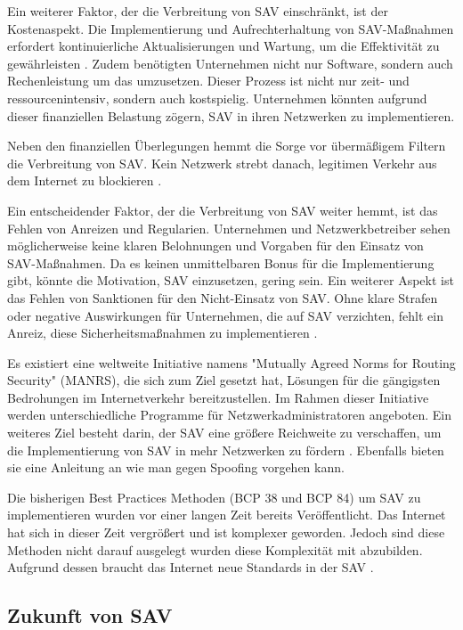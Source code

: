 \documentclass[sigplan,screen]{acmart}
\begin{document}
Ein weiterer Faktor, der die Verbreitung von SAV einschränkt, ist der Kostenaspekt. Die Implementierung und Aufrechterhaltung von SAV-Maßnahmen erfordert kontinuierliche Aktualisierungen und Wartung, um die Effektivität zu gewährleisten \cite{Lone01}. Zudem benötigten Unternehmen nicht nur Software, sondern auch Rechenleistung um das umzusetzen. Dieser Prozess ist nicht nur zeit- und ressourcenintensiv, sondern auch kostspielig. Unternehmen könnten aufgrund dieser finanziellen Belastung zögern, SAV in ihren Netzwerken zu implementieren.

Neben den finanziellen Überlegungen hemmt die Sorge vor übermäßigem Filtern die Verbreitung von SAV. Kein Netzwerk strebt danach, legitimen Verkehr aus dem Internet zu blockieren \cite{FrontDoor01}.

Ein entscheidender Faktor, der die Verbreitung von SAV weiter hemmt, ist das Fehlen von Anreizen und Regularien. Unternehmen und Netzwerkbetreiber sehen möglicherweise keine klaren Belohnungen und Vorgaben für den Einsatz von SAV-Maßnahmen. Da es keinen unmittelbaren Bonus für die Implementierung gibt, könnte die Motivation, SAV einzusetzen, gering sein. Ein weiterer Aspekt ist das Fehlen von Sanktionen für den Nicht-Einsatz von SAV. Ohne klare Strafen oder negative Auswirkungen für Unternehmen, die auf SAV verzichten, fehlt ein Anreiz, diese Sicherheitsmaßnahmen zu implementieren \cite{Lone01}.

Es existiert eine weltweite Initiative namens "Mutually Agreed Norms for Routing Security" (MANRS), die sich zum Ziel gesetzt hat, Lösungen für die gängigsten Bedrohungen im Internetverkehr bereitzustellen. Im Rahmen dieser Initiative werden unterschiedliche Programme für Netzwerkadministratoren angeboten. Ein weiteres Ziel besteht darin, der SAV eine größere Reichweite zu verschaffen, um die Implementierung von SAV in mehr  Netzwerken zu fördern \cite{manrs01}. Ebenfalls bieten sie eine Anleitung \cite{anti-spoofing01} an wie man gegen Spoofing vorgehen kann.

Die bisherigen Best Practices Methoden (BCP 38 und BCP 84) um SAV zu implementieren  wurden vor einer langen Zeit bereits Veröffentlicht. Das Internet hat sich in dieser Zeit vergrößert und ist komplexer geworden. Jedoch sind diese Methoden nicht darauf ausgelegt wurden diese Komplexität mit abzubilden.  Aufgrund dessen braucht das Internet neue Standards in der SAV \cite{SAV_requirements01}.

\subsection{Zukunft von SAV}
\end{document}
